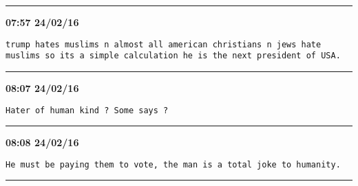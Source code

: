 \hrule%

\begin{adjustwidth}{0cm}{0cm}
\footnotesize \textbf{07:57 24/02/16}

\begin{lstlisting}[breaklines, breakatwhitespace, basicstyle=\small, frame=leftline]
trump hates muslims n almost all american christians n jews hate muslims so its a simple calculation he is the next president of USA.
\end{lstlisting}
\end{adjustwidth}

\hrule%

\begin{adjustwidth}{0cm}{0cm}
\footnotesize \textbf{08:07 24/02/16}

\begin{lstlisting}[breaklines, breakatwhitespace, basicstyle=\small, frame=leftline]
Hater of human kind ? Some says ?
\end{lstlisting}
\end{adjustwidth}

\hrule%

\begin{adjustwidth}{0cm}{0cm}
\footnotesize \textbf{08:08 24/02/16}

\begin{lstlisting}[breaklines, breakatwhitespace, basicstyle=\small, frame=leftline]
He must be paying them to vote, the man is a total joke to humanity.
\end{lstlisting}
\end{adjustwidth}

\hrule%

